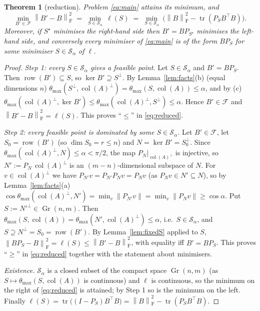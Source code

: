 \documentclass[11pt]{article}
\newtheorem{theorem}{Theorem}[section]
\theoremstyle{definition}
\newcommand{\col}{\operatorname{col}}
\newcommand{\row}{\operatorname{row}}
\newcommand{\tr}{\operatorname{tr}}
\newcommand{\Gr}{\operatorname{Gr}}
\newcommand{\norm}[1]{\left\lVert #1 \right\rVert}
\newcommand{\Fro}{\mathrm{F}}
\newcommand{\Sf}{\mathcal{S}}
\newcommand{\Ff}{\mathcal{F}}
\begin{document}
\begin{theorem}[reduction]\label{thm:reduction}
Problem \eqref{eq:main} attains its minimum, and
\begin{equation}\label{eq:reduced}
  \min_{B'\in\Ff}\norm{B'-B}_\Fro^2 \;=\; \min_{S\in\Sf_\alpha}\ \ell(S)
  \;=\;\min_{S\in\Sf_\alpha}\ \bigl(\norm B_\Fro^2-\tr(P_S B^\top B)\bigr).
\end{equation}
Moreover, if $S^\star$ minimises the right-hand side then $B'=BP_{S^\star}$ minimises the left-hand side, and conversely every minimiser of \eqref{eq:main} is of the form $BP_{S}$ for some minimiser $S\in\Sf_\alpha$ of $\ell$.
\end{theorem}

\begin{proof}
\emph{Step 1: every $S\in\Sf_\alpha$ gives a feasible point.}
Let $S\in\Sf_\alpha$ and $B'=BP_S$. Then $\row(B')\subseteq S$, so $\ker B'\supseteq S^\perp$.
By Lemma~\ref{lem:facts}(b) (equal dimensions $n$) $\theta_{\max}(S^\perp,\col(A)^\perp)=\theta_{\max}(S,\col(A))\le\alpha$, and by (c) $\theta_{\max}(\col(A)^\perp,\ker B')\le\theta_{\max}(\col(A)^\perp,S^\perp)\le\alpha$. Hence $B'\in\Ff$ and $\norm{B'-B}_\Fro^2=\ell(S)$. This proves ``$\le$'' in \eqref{eq:reduced}.

\emph{Step 2: every feasible point is dominated by some $S\in\Sf_\alpha$.}
Let $B'\in\Ff$, let $S_0=\row(B')$ (so $\dim S_0=r\le n$) and $N=\ker B'=S_0^\perp$.
Since $\theta_{\max}(\col(A)^\perp,N)\le\alpha<\pi/2$, the map $P_N|_{\col(A)^\perp}$ is injective, so $N':=P_N\,\col(A)^\perp$ is an $(m-n)$-dimensional subspace of $N$.
For $v\in\col(A)^\perp$ we have $P_{N'}v=P_{N'}P_Nv=P_Nv$ (as $P_Nv\in N'\subseteq N$), so by Lemma~\ref{lem:facts}(a)
$\cos\theta_{\max}(\col(A)^\perp,N')=\min_{v}\norm{P_{N'}v}=\min_v\norm{P_N v}\ge\cos\alpha$.
Put $S:=N'^\perp\in\Gr(n,m)$. Then $\theta_{\max}(S,\col(A))=\theta_{\max}(N',\col(A)^\perp)\le\alpha$, i.e.\ $S\in\Sf_\alpha$, and $S\supseteq N^\perp=S_0=\row(B')$.
By Lemma~\ref{lem:fixedS} applied to $S$, $\norm{BP_S-B}_\Fro^2=\ell(S)\le\norm{B'-B}_\Fro^2$, with equality iff $B'=BP_S$.
This proves ``$\ge$'' in \eqref{eq:reduced} together with the statement about minimisers.

\emph{Existence.} $\Sf_\alpha$ is a closed subset of the compact space $\Gr(n,m)$ (as $S\mapsto\theta_{\max}(S,\col(A))$ is continuous) and $\ell$ is continuous, so the minimum on the right of \eqref{eq:reduced} is attained; by Step 1 so is the minimum on the left.
Finally $\ell(S)=\tr\big((I-P_S)B^\top B\big)=\norm B_\Fro^2-\tr(P_SB^\top B)$.
\end{proof}
\end{document}
